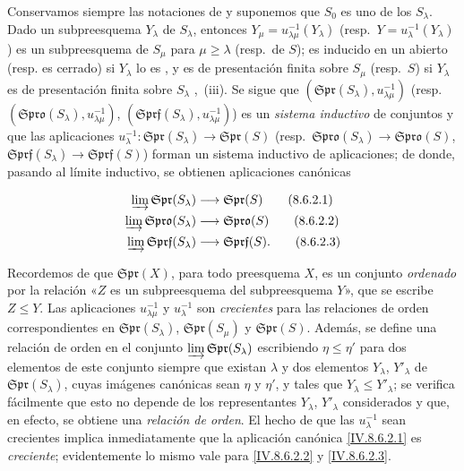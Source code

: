 \begin{env}[8.6.2]
\label{IV.8.6.2-fr}
Conservamos siempre las notaciones de  y suponemos que $S_0$ es uno de los $S_\lambda$.
Dado un subpreesquema $Y_\lambda$ de $S_\lambda$, entonces $Y_\mu=u_{\lambda\mu}^{-1}(Y_\lambda)$ (resp.\ $Y=u_\lambda^{-1}(Y_\lambda)$) es un subpreesquema de $S_\mu$ para $\mu\geq\lambda$ (resp.\ de $S$); es inducido en un abierto (resp. es cerrado) si $Y_\lambda$ lo es , y es de presentación finita sobre $S_\mu$ (resp.\ $S$) si $Y_\lambda$ es de presentación finita sobre $S_\lambda$ ,~(iii). Se sigue que $(\mathfrak{Spr}(S_\lambda),u_{\lambda\mu}^{-1})$ (resp.\ $(\mathfrak{Spro}(S_\lambda),u_{\lambda\mu}^{-1})$, $(\mathfrak{Sprf}(S_\lambda),u_{\lambda\mu}^{-1})$) es un \emph{sistema inductivo} de conjuntos y que las aplicaciones $u_\lambda^{-1}:\mathfrak{Spr}(S_\lambda)\to\mathfrak{Spr}(S)$ (resp.\ $\mathfrak{Spro}(S_\lambda)\to\mathfrak{Spro}(S)$, $\mathfrak{Sprf}(S_\lambda)\to\mathfrak{Sprf}(S)$) forman un sistema inductivo de aplicaciones; de donde, pasando al límite inductivo, se obtienen aplicaciones canónicas


\begin{align}
  \varinjlim\mathfrak{Spr}(S_\lambda)
    &\longrightarrow\mathfrak{Spr}(S)
    \tag{8.6.2.1}\label{IV.8.6.2.1-fr}\\
  \varinjlim\mathfrak{Spro}(S_\lambda)
    &\longrightarrow\mathfrak{Spro}(S)
    \tag{8.6.2.2}\label{IV.8.6.2.2-fr}\\
  \varinjlim\mathfrak{Sprf}(S_\lambda)
    &\longrightarrow\mathfrak{Sprf}(S).
    \tag{8.6.2.3}\label{IV.8.6.2.3-fr}
\end{align}
\end{env}


Recordemos de  que $\mathfrak{Spr}(X)$, para todo preesquema $X$, es un conjunto \emph{ordenado} por la relación «$Z$ es un subpreesquema del subpreesquema $Y$», que se escribe $Z\leq Y$.
Las aplicaciones $u_{\lambda\mu}^{-1}$ y $u_\lambda^{-1}$ son \emph{crecientes} para las relaciones de orden correspondientes en $\mathfrak{Spr}(S_\lambda)$, $\mathfrak{Spr}(S_\mu)$ y $\mathfrak{Spr}(S)$.
Además, se define una relación de orden en el conjunto $\varinjlim\mathfrak{Spr}(S_\lambda)$ escribiendo $\eta\leq\eta'$ para dos elementos de este conjunto siempre que existan $\lambda$ y dos elementos $Y_\lambda$, $Y'_\lambda$ de $\mathfrak{Spr}(S_\lambda)$, cuyas imágenes canónicas sean $\eta$ y $\eta'$, y tales que $Y_\lambda\leq Y'_\lambda$; se verifica fácilmente que esto no depende de los representantes $Y_\lambda$, $Y'_\lambda$ considerados y que, en efecto, se obtiene una \emph{relación de orden}.
El hecho de que las $u_\lambda^{-1}$ sean crecientes implica inmediatamente que la aplicación canónica \eqref{IV.8.6.2.1} es \emph{creciente}; evidentemente lo mismo vale para \eqref{IV.8.6.2.2} y \eqref{IV.8.6.2.3}.

